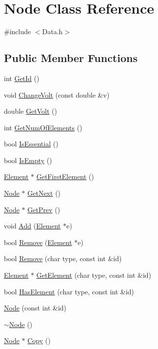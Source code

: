 \hypertarget{class_node}{}\section{Node Class Reference}
\label{class_node}


{\ttfamily \#include $<$Data.\+h$>$}

\subsection*{Public Member Functions}
\begin{DoxyCompactItemize}
\item 
int \hyperlink{class_node_ae90214a3ccf4ead8527329bbe238570c}{Get\+Id} ()
\item 
void \hyperlink{class_node_a1d54adb1267a218ab049f39175cb2733}{Change\+Volt} (const double \&v)
\item 
double \hyperlink{class_node_a9745737f7d87d5f9602380e652f61546}{Get\+Volt} ()
\item 
int \hyperlink{class_node_a8759b5907bf04c1b9a43056409a59d35}{Get\+Num\+Of\+Elements} ()
\item 
bool \hyperlink{class_node_a8f845411f8d2d44530b72810341442ec}{Is\+Essential} ()
\item 
bool \hyperlink{class_node_a962fa54dc2c90850fe319785427c738a}{Is\+Empty} ()
\item 
\hyperlink{class_element}{Element} $\ast$ \hyperlink{class_node_a29da8868ea4053aede270ed96b7425a0}{Get\+First\+Element} ()
\item 
\hyperlink{class_node}{Node} $\ast$ \hyperlink{class_node_a6f8729374beb27838792dc6ef81124e8}{Get\+Next} ()
\item 
\hyperlink{class_node}{Node} $\ast$ \hyperlink{class_node_a02f249f184a587e3353c911457f82ef8}{Get\+Prev} ()
\item 
void \hyperlink{class_node_a4aff13ab274ffa9fa69be340c28ee9d6}{Add} (\hyperlink{class_element}{Element} $\ast$e)
\item 
bool \hyperlink{class_node_ab274bc3fa4b13b1348cc7736b497eef0}{Remove} (\hyperlink{class_element}{Element} $\ast$e)
\item 
bool \hyperlink{class_node_aa3ed7f9b891a39c3fb8661316af413ea}{Remove} (char type, const int \&id)
\item 
\hyperlink{class_element}{Element} $\ast$ \hyperlink{class_node_aeaa68f0080c52716f6d0df146c8f7cf8}{Get\+Element} (char type, const int \&id)
\item 
bool \hyperlink{class_node_a463324063b042abc87cdb61f04798059}{Has\+Element} (char type, const int \&id)
\item 
\hyperlink{class_node_ad31a6c58b167b4a444962ead34cd93a1}{Node} (const int \&id)
\item 
\hyperlink{class_node_aa0840c3cb5c7159be6d992adecd2097c}{$\sim$\+Node} ()
\item 
\hyperlink{class_node}{Node} $\ast$ \hyperlink{class_node_a84931f4fbe5461c5f1553ae37260dd24}{Copy} ()
\end{DoxyCompactItemize}
